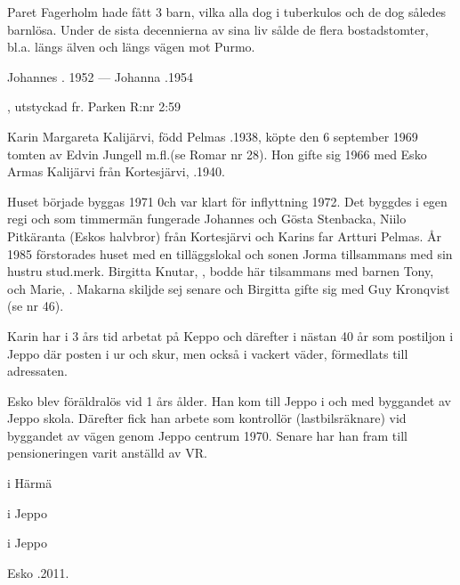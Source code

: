 Paret Fagerholm hade fått 3 barn, vilka alla dog i tuberkulos och de dog således barnlösa. Under de sista decennierna av sina liv sålde de flera bostadstomter,  bl.a. längs älven och längs vägen mot Purmo.

Johannes . 1952  ---  Johanna .1954



%
, utstyckad fr. Parken R:nr 2:59



%
Karin Margareta Kalijärvi, född Pelmas .1938, köpte den 6 september 1969 tomten av Edvin Jungell m.fl.(se Romar nr 28). Hon gifte sig 1966 med Esko Armas Kalijärvi från Kortesjärvi, .1940.

Huset började byggas 1971 0ch var klart för inflyttning 1972. Det byggdes i egen regi och som timmermän fungerade Johannes och Gösta Stenbacka, Niilo Pitkäranta (Eskos halvbror) från Kortesjärvi och Karins far Artturi Pelmas. År 1985 förstorades huset med en tilläggslokal och sonen Jorma tillsammans med sin hustru stud.merk. Birgitta Knutar, , bodde här tilsammans med barnen Tony, 
och Marie, . Makarna skiljde sej senare och Birgitta gifte sig med Guy Kronqvist (se nr 46).

Karin har i 3 års tid arbetat på Keppo och därefter i nästan 40 år som postiljon i Jeppo där posten i ur och skur, men också i vackert väder, förmedlats till adressaten.

Esko blev föräldralös vid 1 års ålder. Han kom till Jeppo i och med byggandet av Jeppo skola. Därefter fick han arbete som kontrollör (lastbilsräknare) vid byggandet av vägen genom Jeppo centrum 1970. Senare har han fram till pensioneringen varit anställd av VR.
\begin{jhchildren}
  \item {} i Härmä
  \item {} i Jeppo
  \item {} i Jeppo
\end{jhchildren}

Esko .2011.


